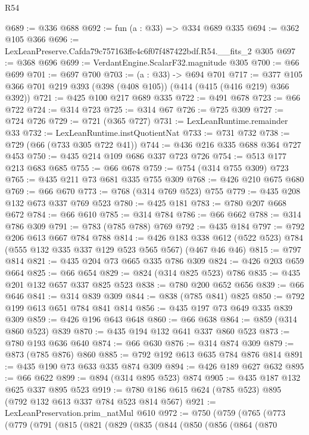 \begin{lexlean}{R54}
\begin{coremodule}
@689 := @336 @688
@692 := fun (a : @33) => @334 @689 @335
@694 := @362 @105 @366
@696 := LexLeanPreserve.Cafda79c757163ffe4c6f07f487422bdf.R54.__fits_2 @305
@697 := @368 @696
@699 := VerdantEngine.ScalarF32.magnitude @305
@700 := @66 @699
@701 := @697 @700
@703 := (a : @33) -> @694 @701
@717 := @377 @105 @366 @701 @219 @393 (@398 (@408 @105)) (@414 (@415 (@416 @219) @366 @392))
@721 := @425 @100 @217 @689 @335
@722 := @491 @678
@723 := @66 @722
@724 := @314 @723
@725 := @314 @67
@726 := @725 @309
@727 := @724 @726
@729 := @721 (@365 @727)
@731 := LexLeanRuntime.remainder @33
@732 := LexLeanRuntime.instQuotientNat
@733 := @731 @732
@738 := @729 (@66 (@733 @305 @722 @41))
@744 := @436 @216 @335 @688 @364 @727 @453
@750 := @435 @214 @109 @686 @337 @723 @726
@754 := @513 @177 @213 @683 @685
@755 := @66 @678
@759 := @754 (@314 @755 @309) @723
@765 := @435 @211 @73 @681 @335 @755 @309
@768 := @426 @210 @675 @680
@769 := @66 @670
@773 := @768 (@314 @769 @523) @755
@779 := @435 @208 @132 @673 @337 @769 @523
@780 := @425 @181
@783 := @780 @207 @668 @672
@784 := @66 @610
@785 := @314 @784
@786 := @66 @662
@788 := @314 @786 @309
@791 := @783 (@785 @788) @769
@792 := @435 @184
@797 := @792 @206 @613 @667 @784 @788
@814 := @426
    @183
    @338
    @612
    (@522 @523)
    @784
    (@555 @132 @335 @337 @129 @523 @565 @567)
    (@467 @46 @46)
@815 := @797 @814
@821 := @435 @204 @73 @665 @335 @786 @309
@824 := @426 @203 @659 @664
@825 := @66 @654
@829 := @824 (@314 @825 @523) @786
@835 := @435 @201 @132 @657 @337 @825 @523
@838 := @780 @200 @652 @656
@839 := @66 @646
@841 := @314 @839 @309
@844 := @838 (@785 @841) @825
@850 := @792 @199 @613 @651 @784 @841 @814
@856 := @435 @197 @73 @649 @335 @839 @309
@859 := @426 @196 @643 @648
@860 := @66 @638
@864 := @859 (@314 @860 @523) @839
@870 := @435 @194 @132 @641 @337 @860 @523
@873 := @780 @193 @636 @640
@874 := @66 @630
@876 := @314 @874 @309
@879 := @873 (@785 @876) @860
@885 := @792 @192 @613 @635 @784 @876 @814
@891 := @435 @190 @73 @633 @335 @874 @309
@894 := @426 @189 @627 @632
@895 := @66 @622
@899 := @894 (@314 @895 @523) @874
@905 := @435 @187 @132 @625 @337 @895 @523
@919 := @780 @186 @615 @624 (@785 @523) @895 (@792 @132 @613 @337 @784 @523 @814 @567)
@921 := LexLeanPreservation.prim_natMul @610
@972 := @750
    (@759
      (@765
        (@773
          (@779
            (@791
              (@815
                (@821
                  (@829
                    (@835
                      (@844
                        (@850
                          (@856
                            (@864
                              (@870

\end{coremodule}
\end{lexlean}
